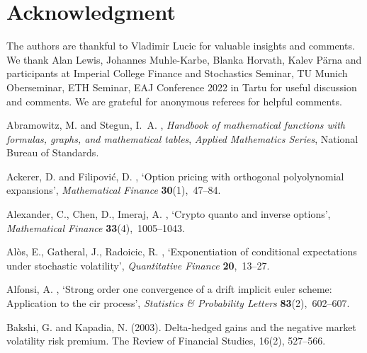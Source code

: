 \documentclass[pdftex,11pt,a4paper] {article}
\begin{document}
\section*{Acknowledgment}

The authors are thankful to Vladimir Lucic for valuable insights and comments. We thank Alan Lewis, Johannes Muhle-Karbe, Blanka Horvath, Kalev P\"arna and participants at Imperial College Finance and Stochastics Seminar, TU Munich Oberseminar, ETH Seminar, EAJ Conference 2022 in Tartu for useful discussion and comments. We are grateful for anonymous referees for helpful comments. 



\begin{thebibliography}{}

Abramowitz, M. and Stegun, I.~A.  \harvardyearright , {\em Handbook of mathematical functions with
  formulas, graphs, and mathematical tables}, {\em Applied
  Mathematics Series}, National Bureau of Standards.

Ackerer, D. and Filipovi{\'c}, D.  \harvardyearright , `Option pricing with orthogonal polyolynomial
  expansions', {\em Mathematical Finance} {\bf 30}(1),~47--84.

Alexander, C., Chen, D., Imeraj, A. \harvardyearright , `Crypto quanto and inverse options', {\em Mathematical Finance} {\bf 33}(4),~1005--1043.

Al\`os, E., Gatheral, J., Radoicic, R. \harvardyearright , `Exponentiation of conditional expectations under
stochastic volatility', {\em Quantitative Finance} {\bf 20},~13--27.
	
	
Alfonsi, A.  \harvardyearright , `Strong order one
  convergence of a drift implicit euler scheme: Application to the cir
  process', {\em Statistics \& Probability Letters} {\bf 83}(2),~602--607.

Bakshi, G. and Kapadia, N. (2003). Delta-hedged gains and the negative market volatility risk premium. The Review of Financial Studies, 16(2), 527--566.



\end{thebibliography}
\end{document}
